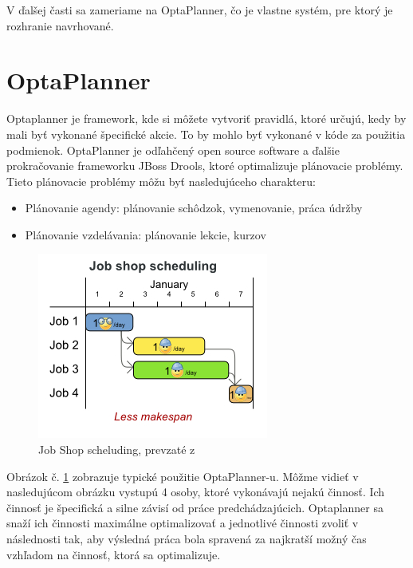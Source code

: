 V ďalšej časti sa zameriame na OptaPlanner, čo je vlastne systém, pre ktorý je rozhranie navrhované.




\section{OptaPlanner}
Optaplanner je framework, kde si môžete vytvoriť pravidlá, ktoré určujú, kedy by mali byť vykonané špecifické akcie. To by mohlo byť vykonané v kóde za použitia podmienok.
OptaPlanner je odľahčený open source software a ďalšie prokračovanie frameworku JBoss Drools, ktoré optimalizuje plánovacie problémy.\cite{optaweb} Tieto plánovacie problémy môžu byť nasledujúceho charakteru: 
\begin{itemize}
\item Plánovanie agendy: plánovanie schôdzok, vymenovanie, práca údržby
\item Plánovanie vzdelávania: plánovanie lekcie, kurzov
\end{itemize}
\begin{figure}[htb]

\begin{center}

\includegraphics[scale=0.5]{fig/useCaseOverview.jpg} 
\caption{Job  Shop scheluding, prevzaté z  }
\label{obrazokUseCase}

\end{center}

\end{figure}
Obrázok č. \ref{obrazokUseCase} zobrazuje typické použitie OptaPlanner-u. Môžme vidieť v nasledujúcom obrázku vystupú 4 osoby, ktoré vykonávajú nejakú činnosť. Ich činnosť je špecifická a silne závisí od práce predchádzajúcich. Optaplanner sa snaží ich činnosti maximálne optimalizovať a jednotlivé činnosti zvoliť v následnosti tak, aby výsledná práca bola spravená za najkratší možný čas vzhľadom na činnosť, ktorá sa optimalizuje.


